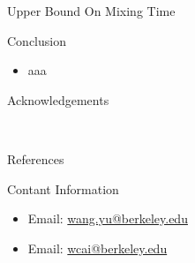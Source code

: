\documentclass[final]{beamer}
\newlength{\onecolwid}
\begin{document}
\begin{frame}[t]
\begin{columns}[t]
\begin{column}{\onecolwid}
\begin{block}{Upper Bound On Mixing Time}
\end{block}


\begin{block}{Conclusion}

\begin{itemize}
    \item aaa
\end{itemize}

\end{block}


\begin{block}{Acknowledgements}

\small{} \\

\end{block}



\begin{block}{References}

\nocite{*} %
\small{
\vspace{0.75in}}

\end{block}




\begin{block}{Contant Information}

\begin{itemize}
\item Email: \href{mailto:wang.yu@berkeley.edu}{wang.yu@berkeley.edu}
\item Email: \href{mailto:wcai@berkeley.edu}{wcai@berkeley.edu}
\end{itemize}



\end{block}
\end{column}
\end{columns}
\end{frame}
\end{document}
